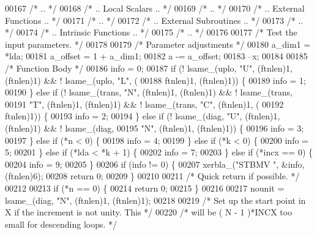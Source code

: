 \begin{DoxyCode}
00167 \textcolor{comment}{/*     .. */}
00168 \textcolor{comment}{/*     .. Local Scalars .. */}
00169 \textcolor{comment}{/*     .. */}
00170 \textcolor{comment}{/*     .. External Functions .. */}
00171 \textcolor{comment}{/*     .. */}
00172 \textcolor{comment}{/*     .. External Subroutines .. */}
00173 \textcolor{comment}{/*     .. */}
00174 \textcolor{comment}{/*     .. Intrinsic Functions .. */}
00175 \textcolor{comment}{/*     .. */}
00176 
00177 \textcolor{comment}{/*     Test the input parameters. */}
00178 
00179     \textcolor{comment}{/* Parameter adjustments */}
00180     a\_dim1 = *lda;
00181     a\_offset = 1 + a\_dim1;
00182     a -= a\_offset;
00183     --x;
00184 
00185     \textcolor{comment}{/* Function Body */}
00186     info = 0;
00187     \textcolor{keywordflow}{if} (! lsame\_(uplo, \textcolor{stringliteral}{"U"}, (ftnlen)1, (ftnlen)1) && ! lsame\_(uplo, \textcolor{stringliteral}{"L"}, (
00188         ftnlen)1, (ftnlen)1)) \{
00189     info = 1;
00190     \} \textcolor{keywordflow}{else} \textcolor{keywordflow}{if} (! lsame\_(trans, \textcolor{stringliteral}{"N"}, (ftnlen)1, (ftnlen)1) && ! lsame\_(trans, 
00191         \textcolor{stringliteral}{"T"}, (ftnlen)1, (ftnlen)1) && ! lsame\_(trans, \textcolor{stringliteral}{"C"}, (ftnlen)1, (
00192         ftnlen)1)) \{
00193     info = 2;
00194     \} \textcolor{keywordflow}{else} \textcolor{keywordflow}{if} (! lsame\_(diag, \textcolor{stringliteral}{"U"}, (ftnlen)1, (ftnlen)1) && ! lsame\_(diag, 
00195         \textcolor{stringliteral}{"N"}, (ftnlen)1, (ftnlen)1)) \{
00196     info = 3;
00197     \} \textcolor{keywordflow}{else} \textcolor{keywordflow}{if} (*n < 0) \{
00198     info = 4;
00199     \} \textcolor{keywordflow}{else} \textcolor{keywordflow}{if} (*k < 0) \{
00200     info = 5;
00201     \} \textcolor{keywordflow}{else} \textcolor{keywordflow}{if} (*lda < *k + 1) \{
00202     info = 7;
00203     \} \textcolor{keywordflow}{else} \textcolor{keywordflow}{if} (*incx == 0) \{
00204     info = 9;
00205     \}
00206     \textcolor{keywordflow}{if} (info != 0) \{
00207     xerbla\_(\textcolor{stringliteral}{"STBMV "}, &info, (ftnlen)6);
00208     \textcolor{keywordflow}{return} 0;
00209     \}
00210 
00211 \textcolor{comment}{/*     Quick return if possible. */}
00212 
00213     \textcolor{keywordflow}{if} (*n == 0) \{
00214     \textcolor{keywordflow}{return} 0;
00215     \}
00216 
00217     nounit = lsame\_(diag, \textcolor{stringliteral}{"N"}, (ftnlen)1, (ftnlen)1);
00218 
00219 \textcolor{comment}{/*     Set up the start point in X if the increment is not unity. This */}
00220 \textcolor{comment}{/*     will be  ( N - 1 )*INCX   too small for descending loops. */}

\end{DoxyCode}
